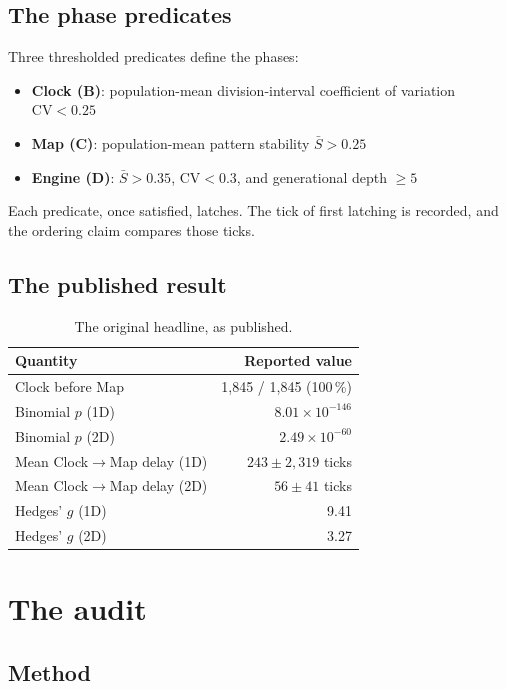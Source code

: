 \documentclass[11pt,letterpaper]{article}
\begin{document}
\subsection{The phase predicates}

Three thresholded predicates define the phases:

\begin{itemize}
\item \textbf{Clock (B)}: population-mean division-interval coefficient
      of variation $\mathrm{CV} < 0.25$
\item \textbf{Map (C)}: population-mean pattern stability
      $\bar{S} > 0.25$
\item \textbf{Engine (D)}: $\bar{S} > 0.35$, $\mathrm{CV} < 0.3$, and
      generational depth $\geq 5$
\end{itemize}

Each predicate, once satisfied, latches. The tick of first latching is
recorded, and the ordering claim compares those ticks.

\subsection{The published result}

\begin{table}[H]
\centering
\caption{The original headline, as published.}
\begin{tabular}{lr}
\toprule
Quantity & Reported value \\
\midrule
Clock before Map & 1{,}845 / 1{,}845 (100\,\%) \\
Binomial $p$ (1D) & $8.01 \times 10^{-146}$ \\
Binomial $p$ (2D) & $2.49 \times 10^{-60}$ \\
Mean Clock$\to$Map delay (1D) & $243 \pm 2{,}319$ ticks \\
Mean Clock$\to$Map delay (2D) & $56 \pm 41$ ticks \\
Hedges' $g$ (1D) & 9.41 \\
Hedges' $g$ (2D) & 3.27 \\
\bottomrule
\end{tabular}
\end{table}

\section{The audit}

\subsection{Method}
\end{document}
